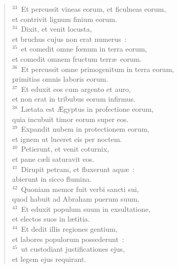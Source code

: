 \begin{flushleft}
\begin{verse}
${}^{33}$~Et percussit vineas eorum, et ficulneas eorum,\\ et contrivit lignum finium eorum.\\
${}^{34}$~Dixit, et venit locusta,\\ et bruchus cujus non erat numerus~:\\
${}^{35}$~et comedit omne fœnum in terra eorum,\\ et comedit omnem fructum terr\ae\ eorum.\\
${}^{36}$~Et percussit omne primogenitum in terra eorum,\\ primitias omnis laboris eorum.\\
${}^{37}$~Et eduxit eos cum argento et auro,\\ et non erat in tribubus eorum infirmus.\\
${}^{38}$~L\ae tata est \AE gyptus in profectione eorum,\\ quia incubuit timor eorum super eos.\\
${}^{39}$~Expandit nubem in protectionem eorum,\\ et ignem ut luceret eis per noctem.\\
${}^{40}$~Petierunt, et venit coturnix,\\ et pane c\ae li saturavit eos.\\
${}^{41}$~Dirupit petram, et fluxerunt aqu\ae~:\\ abierunt in sicco flumina.\\
${}^{42}$~Quoniam memor fuit verbi sancti sui,\\ quod habuit ad Abraham puerum suum.\\
${}^{43}$~Et eduxit populum suum in exsultatione,\\ et electos suos in l\ae titia.\\
${}^{44}$~Et dedit illis regiones gentium,\\ et labores populorum possederunt~:\\
${}^{45}$~ut custodiant justificationes ejus,\\ et legem ejus requirant.\end{verse}\end{flushleft}




